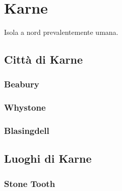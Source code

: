 \section{Karne}
Isola a nord prevalentemente umana.
\subsection{Citt\`a di Karne}
\subsubsection{Beabury}
\subsubsection{Whystone}
\subsubsection{Blasingdell}
\subsection{Luoghi di Karne}
\subsubsection{Stone Tooth}